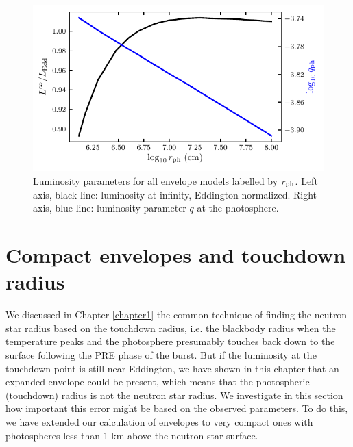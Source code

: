 \documentclass[../main.tex]{subfiles}
\begin{document}
\begin{figure}[htb!]
    \centering
    \includegraphics{figures/env_rphot.pdf}
    \caption[Envelope luminosities]{Luminosity parameters for all envelope models labelled by $r_\text{ph}$. Left axis, black line: luminosity at infinity, Eddington normalized. Right axis, blue line: luminosity parameter $q$ at the photosphere.}
    \label{fig:env_rphot}
\end{figure}

\section{Compact envelopes and touchdown radius}\label{sec:compact_envelopes}

We discussed in Chapter \ref{chapter1} the common technique of finding the neutron star radius based on the touchdown radius, i.e. the blackbody radius when the temperature peaks and the photosphere presumably touches back down to the surface following the PRE phase of the burst. But if the luminosity at the touchdown point is still near-Eddington, we have shown in this chapter that an expanded envelope could be present, which means that the photospheric (touchdown) radius is not the neutron star radius. We investigate in this section how important this error might be based on the observed parameters. To do this, we have extended our calculation of envelopes to very compact ones with photospheres less than 1 km above the neutron star surface.
\end{document}
